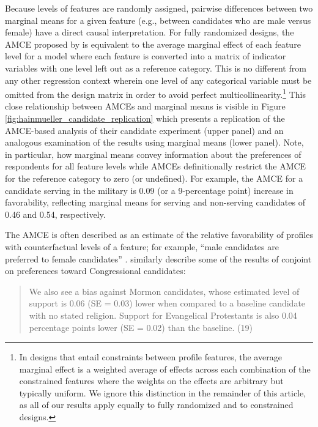 \documentclass[a4paper,12pt]{article}\usepackage[]{graphicx}\usepackage[]{color}
\begin{document}
Because levels of features are randomly assigned, pairwise differences between two marginal means for a given feature (e.g., between candidates who are male versus female) have a direct causal interpretation. For fully randomized designs, the AMCE proposed by \citet{HainmuellerHopkinsYamamoto2014} is equivalent to the average marginal effect of each feature level for a model where each feature is converted into a matrix of indicator variables with one level left out as a reference category. This is no different from any other regression context wherein one level of any categorical variable must be omitted from the design matrix in order to avoid perfect multicollinearity.\footnote{In designs that entail constraints between profile features, the average marginal effect is a weighted average of effects across each combination of the constrained features where the weights on the effects are arbitrary but typically uniform. We ignore this distinction in the remainder of this article, as all of our results apply equally to fully randomized and to constrained designs.} This close relationship between AMCEs and marginal means is visible in Figure \ref{fig:hainmueller_candidate_replication} which presents a replication of the AMCE-based analysis of their candidate experiment (upper panel) and an analogous examination of the results using marginal means (lower panel). Note, in particular, how marginal means convey information about the preferences of respondents for all feature levels while AMCEs definitionally restrict the AMCE for the reference category to zero (or undefined). For example, the AMCE for a candidate serving in the military is 0.09 (or a 9-percentage point) increase in favorability, reflecting marginal means for serving and non-serving candidates of 0.46 and 0.54, respectively.

The AMCE is often described as an estimate of the relative favorability of profiles with counterfactual levels of a feature; for example, ``male candidates are preferred to female candidates'' \citep[6]{TeeleKallaRosenbluth2018}. \citet{HainmuellerHopkinsYamamoto2014} similarly describe some of the results of conjoint on preferences toward Congressional candidates:

\begin{quote}
We also see a bias against Mormon candidates, whose estimated level of support is 0.06 (SE = 0.03) lower when compared to a baseline candidate with no stated religion. Support for Evangelical Protestants is also 0.04 percentage points lower (SE = 0.02) than the baseline. (19)
\end{quote}
\end{document}
